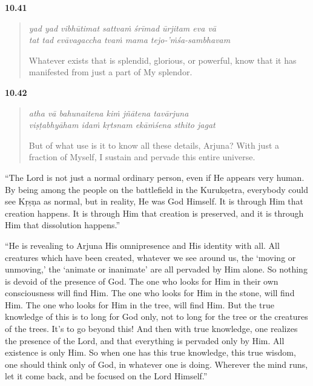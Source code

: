 \par\noindent\textbf{10.41}\par
\begin{verse}
\textit{yad yad vibhūtimat sattvaṁ śrīmad ūrjitam eva vā} \\
\textit{tat tad evāvagaccha tvaṁ mama tejo-’ṁśa-sambhavam}

\noindent Whatever exists that is splendid, glorious, or powerful, know that it has manifested from just a part of My splendor.
\end{verse}
\par



\par\noindent\textbf{10.42}\par
\begin{verse}
\textit{atha vā bahunaitena kiṁ jñātena tavārjuna} \\
\textit{viṣṭabhyāham idaṁ kṛtsnam ekāṁśena sthito jagat}

\noindent But of what use is it to know all these details, Arjuna? With just a fraction of Myself, I sustain and pervade this entire universe.
\end{verse}
\par


\enquote{The Lord is not just a normal ordinary person, even if He appears very human. By being among the people on the battlefield in the Kurukṣetra, everybody could see Kṛṣṇa as normal, but in reality, He was God Himself. It is through Him that creation happens. It is through Him that creation is preserved, and it is through Him that dissolution happens.}

\enquote{He is revealing to Arjuna His omnipresence and His identity with all. All creatures which have been created, whatever we see around us, the \enquote{moving or unmoving,} the \enquote{animate or inanimate} are all pervaded by Him alone. So nothing is devoid of the presence of God. The one who looks for Him in their own consciousness will find Him. The one who looks for Him in the stone, will find Him. The one who looks for Him in the tree, will find Him. But the true knowledge of this is to long for God only, not to long for the tree or the creatures of the trees. It’s to go beyond this! And then with true knowledge, one realizes the presence of the Lord, and that everything is pervaded only by Him. All existence is only Him. So when one has this true knowledge, this true wisdom, one should think only of God, in whatever one is doing. Wherever the mind runs, let it come back, and be focused on the Lord Himself.}

